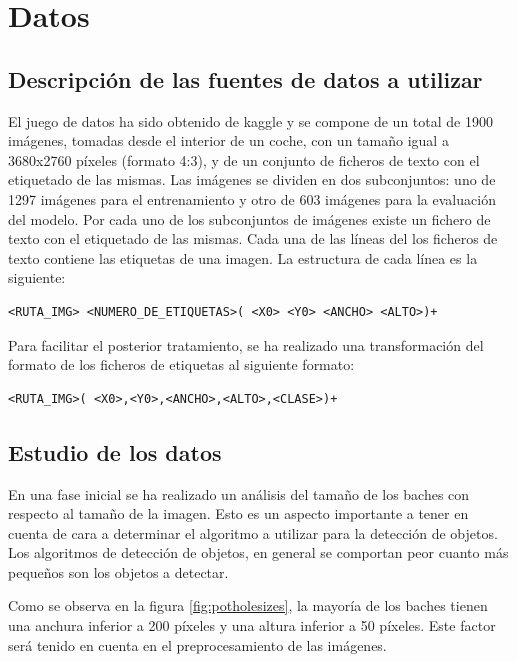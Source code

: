 \section{Datos}
\label{sec:datos}

\subsection{Descripción de las fuentes de datos a utilizar}

El juego de datos ha sido obtenido de kaggle \cite{s4_potholedataset} y se compone de un total de 1900 imágenes, tomadas desde el interior de un coche, con un tamaño igual a 3680x2760 píxeles (formato 4:3), y de un conjunto de ficheros de texto con el etiquetado de las mismas. Las imágenes se dividen en dos subconjuntos: uno de 1297 imágenes para el entrenamiento y otro de 603 imágenes para la evaluación del modelo. Por cada uno de los subconjuntos de imágenes existe un fichero de texto con el etiquetado de las mismas. Cada una de las líneas del los ficheros de texto contiene las etiquetas de una imagen. La estructura de cada línea es la siguiente:

\begin{lstlisting}[frame=single,basicstyle=\ttfamily\footnotesize]
<RUTA_IMG> <NUMERO_DE_ETIQUETAS>( <X0> <Y0> <ANCHO> <ALTO>)+
\end{lstlisting}

Para facilitar el posterior tratamiento, se ha realizado una transformación del formato de los ficheros de etiquetas al siguiente formato:

\begin{lstlisting}[frame=single,basicstyle=\ttfamily\footnotesize]
<RUTA_IMG>( <X0>,<Y0>,<ANCHO>,<ALTO>,<CLASE>)+
\end{lstlisting}

\subsection{Estudio de los datos}

En una fase inicial se ha realizado un análisis del tamaño de los baches con respecto al tamaño de la imagen. Esto es un aspecto importante a tener en cuenta de cara a determinar el algoritmo a utilizar para la detección de objetos. Los algoritmos de detección de objetos, en general se comportan peor cuanto más pequeños son los objetos a detectar.

Como se observa en la figura \ref{fig:potholesizes}, la mayoría de los baches tienen una anchura inferior a 200 píxeles y una altura inferior a 50 píxeles. Este factor será tenido en cuenta en el preprocesamiento de las imágenes.

